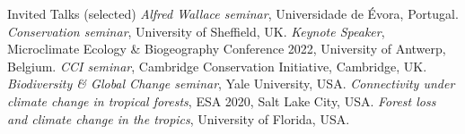 \begin{rubric}{Invited Talks (selected)}
\entry*[2023] \emph{Alfred Wallace seminar}, Universidade de Évora, Portugal.
\entry*[2022] \emph{Conservation seminar}, University of Sheffield, UK.
\entry*[2022] \emph{Keynote Speaker}, Microclimate Ecology \& Biogeography Conference 2022, University of Antwerp, Belgium.
\entry*[2022] \emph{CCI seminar}, Cambridge Conservation Initiative, Cambridge, UK.
\entry*[2021] \emph{Biodiversity \& Global Change seminar}, Yale University, USA.
\entry*[2021] \emph{Connectivity under climate change in tropical forests}, ESA 2020, Salt Lake City, USA.
\entry*[2019] \emph{Forest loss and climate change in the tropics}, University of Florida, USA.
\end{rubric}